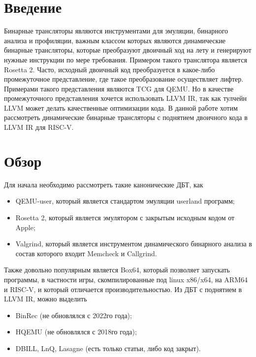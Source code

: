 
\section{Введение}
Бинарные трансляторы являются инструментами для эмуляции, бинарного анализа и профиляции, важным классом которых являются динамические бинарные трансляторы, которые преобразуют двоичный ход на лету и генерируют нужные инструкции по мере требования. Примером такого транслятора является Rosetta 2. Часто, исходный двоичный код преобразуется в какое-либо промежуточное представление, где такое преобразование осуществляет лифтер. Примерами такого представления являются TCG для QEMU. Но в качестве промежуточного представления хочется использовать LLVM IR, так как тулчейн LLVM может делать качественные оптимизации кода. В данной работе хотим рассмотреть динамические бинарные трансляторы с поднятием двоичного кода в LLVM IR для RISC-V.
\section{Обзор}
Для начала необходимо рассмотреть такие канонические ДБТ, как
\begin{itemize}
    \item QEMU-user, который является стандартом эмуляции userland программ;
    \item Rosetta 2, который является эмулятором с закрытым исходным кодом от Apple;
    \item Valgrind, который является инструментом динамического бинарного анализа в состав которого входит Memcheck и Callgrind.
\end{itemize}

Также довольно популярным является Box64, который позволяет запускать программы, в частности игры, скомпилированные под linux x86/x64, на ARM64 и RISC-V, и который отличается производительностью.
Из ДБТ с поднятием в LLVM IR, можно выделить
\begin{itemize}
    \item BinRec (не обновлялся с 2022го года);
    \item HQEMU (не обновлялся с 2018го года);
    \item DBILL, LnQ, Lasagne (есть только статьи, либо код закрыт).
\end{itemize}

